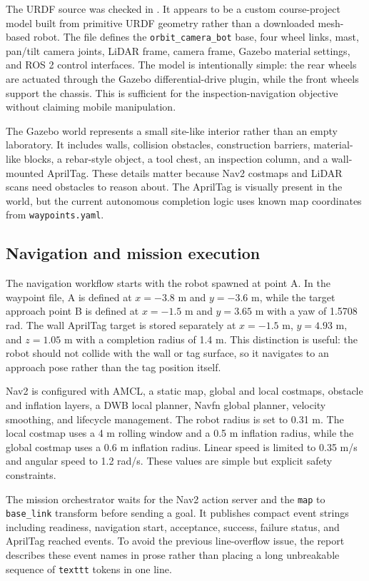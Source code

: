 \documentclass[12pt,a4paper]{article}
\begin{document}
The URDF source was checked in . It appears to be a custom course-project model built from primitive URDF geometry rather than a downloaded mesh-based robot. The file defines the \texttt{orbit\_camera\_bot} base, four wheel links, mast, pan/tilt camera joints, LiDAR frame, camera frame, Gazebo material settings, and ROS 2 control interfaces. The model is intentionally simple: the rear wheels are actuated through the Gazebo differential-drive plugin, while the front wheels support the chassis. This is sufficient for the inspection-navigation objective without claiming mobile manipulation.

The Gazebo world represents a small site-like interior rather than an empty laboratory. It includes walls, collision obstacles, construction barriers, material-like blocks, a rebar-style object, a tool chest, an inspection column, and a wall-mounted AprilTag. These details matter because Nav2 costmaps and LiDAR scans need obstacles to reason about. The AprilTag is visually present in the world, but the current autonomous completion logic uses known map coordinates from \texttt{waypoints.yaml}.

\subsection{Navigation and mission execution}

The navigation workflow starts with the robot spawned at point A. In the waypoint file, A is defined at $x=-3.8$ m and $y=-3.6$ m, while the target approach point B is defined at $x=-1.5$ m and $y=3.65$ m with a yaw of 1.5708 rad. The wall AprilTag target is stored separately at $x=-1.5$ m, $y=4.93$ m, and $z=1.05$ m with a completion radius of 1.4 m. This distinction is useful: the robot should not collide with the wall or tag surface, so it navigates to an approach pose rather than the tag position itself.

Nav2 is configured with AMCL, a static map, global and local costmaps, obstacle and inflation layers, a DWB local planner, Navfn global planner, velocity smoothing, and lifecycle management. The robot radius is set to 0.31 m. The local costmap uses a 4 m rolling window and a 0.5 m inflation radius, while the global costmap uses a 0.6 m inflation radius. Linear speed is limited to 0.35 m/s and angular speed to 1.2 rad/s. These values are simple but explicit safety constraints.

The mission orchestrator waits for the Nav2 action server and the \texttt{map} to \texttt{base\_link} transform before sending a goal. It publishes compact event strings including readiness, navigation start, acceptance, success, failure status, and AprilTag reached events. To avoid the previous line-overflow issue, the report describes these event names in prose rather than placing a long unbreakable sequence of \texttt{texttt} tokens in one line.
\end{document}
